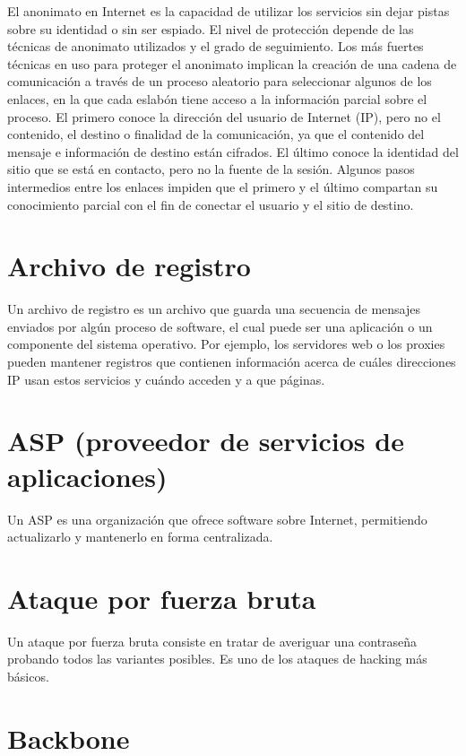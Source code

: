 \documentclass[10pt,a5paper,twoside,,]{book}
\begin{document}
El anonimato en Internet es la capacidad de utilizar los servicios sin
dejar pistas sobre su identidad o sin ser espiado. El nivel de
protección depende de las técnicas de anonimato utilizados y el grado de
seguimiento. Los más fuertes técnicas en uso para proteger el anonimato
implican la creación de una cadena de comunicación a través de un
proceso aleatorio para seleccionar algunos de los enlaces, en la que
cada eslabón tiene acceso a la información parcial sobre el proceso. El
primero conoce la dirección del usuario de Internet (IP), pero no el
contenido, el destino o finalidad de la comunicación, ya que el
contenido del mensaje e información de destino están cifrados. El último
conoce la identidad del sitio que se está en contacto, pero no la fuente
de la sesión. Algunos pasos intermedios entre los enlaces impiden que el
primero y el último compartan su conocimiento parcial con el fin de
conectar el usuario y el sitio de destino.

\section{Archivo de registro}\label{archivo-de-registro}

Un archivo de registro es un archivo que guarda una secuencia de
mensajes enviados por algún proceso de software, el cual puede ser una
aplicación o un componente del sistema operativo. Por ejemplo, los
servidores web o los proxies pueden mantener registros que contienen
información acerca de cuáles direcciones IP usan estos servicios y
cuándo acceden y a que páginas.

\section{ASP (proveedor de servicios de
aplicaciones)}\label{asp-proveedor-de-servicios-de-aplicaciones}

Un ASP es una organización que ofrece software sobre Internet,
permitiendo actualizarlo y mantenerlo en forma centralizada.

\section{Ataque por fuerza bruta}\label{ataque-por-fuerza-bruta}

Un ataque por fuerza bruta consiste en tratar de averiguar una
contraseña probando todos las variantes posibles. Es uno de los ataques
de hacking más básicos.

\section{Backbone}\label{backbone}
\end{document}

